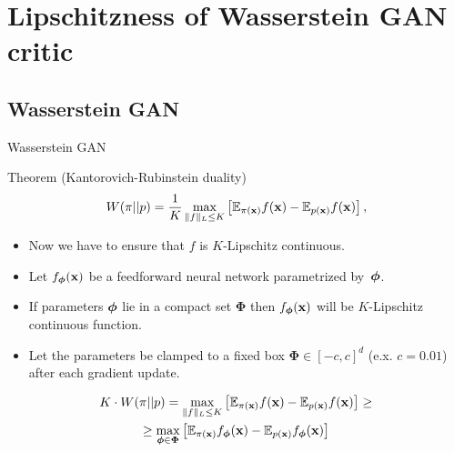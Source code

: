\section{Lipschitzness of Wasserstein GAN critic}
\subsection{Wasserstein GAN}
\begin{frame}{Wasserstein GAN}
	\begin{block}{Theorem (Kantorovich-Rubinstein duality)}
		\[
		W(\pi || p) = \frac{1}{K} \max_{\| f \|_L \leq K} \left[ \mathbb{E}_{\pi(\mathbf{x})} f(\mathbf{x})  - \mathbb{E}_{p(\mathbf{x})} f(\mathbf{x})\right],
		\]
	\end{block}
	\begin{itemize}
		\item Now we have to ensure that $f$ is $K$-Lipschitz continuous.
		\item Let $f_{\boldsymbol{\phi}}(\mathbf{x})$ be a feedforward neural network parametrized by~$\boldsymbol{\phi}$.
		\item If parameters $\boldsymbol{\phi}$ lie in a compact set $\boldsymbol{\Phi}$ then $f_{\boldsymbol{\phi}}(\mathbf{x})$ will be $K$-Lipschitz continuous function. 
		\item Let the parameters be clamped to a fixed box $\boldsymbol{\Phi} \in [-c, c]^d$ (e.x. $c = 0.01$) after each gradient update.
	\end{itemize}
	\begin{multline*}
		K \cdot W(\pi || p) = \max_{\| f \|_L \leq K} \left[ \mathbb{E}_{\pi(\mathbf{x})} f(\mathbf{x})  - \mathbb{E}_{p(\mathbf{x})} f(\mathbf{x})\right] \geq \\  \geq \max_{\boldsymbol{\phi} \in \boldsymbol{\Phi}} \left[ \mathbb{E}_{\pi(\mathbf{x})} f_{\boldsymbol{\phi}}(\mathbf{x})  - \mathbb{E}_{p(\mathbf{x})} f_{\boldsymbol{\phi}}(\mathbf{x})\right]
	\end{multline*}
	
\end{frame}

